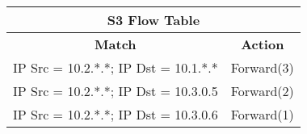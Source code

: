 \documentclass{article}
\begin{document}
\begin{latin}
\begin{table}[H]
\begin{tabular}{|lc|}
\hline
\multicolumn{2}{|c|}{\textbf{S3 Flow Table}}                                                 \\ \hline
\multicolumn{1}{|c|}{\textbf{Match}}                       & \textbf{Action}                 \\ \hline
\multicolumn{1}{|l|}{IP Src = 10.2.*.*; IP Dst = 10.1.*.*} & \multicolumn{1}{l|}{Forward(3)} \\ \hline
\multicolumn{1}{|l|}{IP Src = 10.2.*.*; IP Dst = 10.3.0.5} & Forward(2)                      \\ \hline
\multicolumn{1}{|l|}{IP Src = 10.2.*.*; IP Dst = 10.3.0.6} & Forward(1)                      \\ \hline
\end{tabular}
\end{table}
\end{latin}
\end{document}
